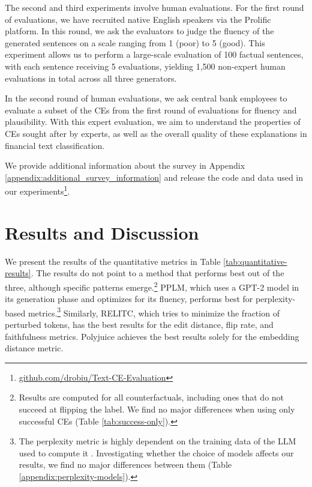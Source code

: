 \documentclass[11pt]{article}
\begin{document}
The second and third experiments involve human evaluations. For the first round of evaluations, we have recruited native English speakers via the Prolific platform. In this round, we ask the evaluators to judge the fluency of the generated sentences on a scale ranging from 1 (poor) to 5 (good). This experiment allows us to perform a large-scale evaluation of 100 factual sentences, with each sentence receiving 5 evaluations, yielding 1,500 non-expert human evaluations in total across all three generators.

In the second round of human evaluations, we ask central bank employees to evaluate a subset of the CEs from the first round of evaluations for fluency and plausibility. 
With this expert evaluation, we aim to understand the properties of CEs sought after by experts, as well as the overall quality of these explanations in financial text classification.

We provide additional information about the survey 
in Appendix \ref{appendix:additional_survey_information} and release the code and data used in our experiments\footnote{\href{https://github.com/drobiu/Text-CE-Evaluation}{github.com/drobiu/Text-CE-Evaluation}}.

\section{Results and Discussion}

We present the results of the quantitative metrics in Table \ref{tab:quantitative-results}. The results do not point to a method that performs best out of the three, although specific patterns emerge.\footnote{Results are computed for all counterfactuals, including ones that do not succeed at flipping the label. We find no major differences when using only successful CEs (Table \ref{tab:success-only}).} PPLM, which uses a GPT-2 model in its generation phase and optimizes for its fluency, performs best for perplexity-based metrics.\footnote{The perplexity metric is highly dependent on the training data of the LLM used to compute it \cite{meister_language_2021}. Investigating whether the choice of models affects our results, we find no major differences between them (Table \ref{appendix:perplexity-models}).} Similarly, RELITC, which tries to minimize the fraction of perturbed tokens, has the best results for the edit distance, flip rate, and faithfulness metrics. Polyjuice achieves the best results solely for the embedding distance metric.
\end{document}
